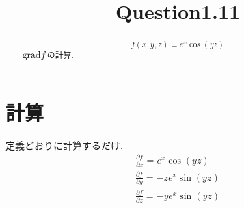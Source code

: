 \documentclass{jsarticle}
\title{Question1.11}
\newcommand*{\grad}{{\rm grad}}
\begin{document}
\maketitle

\begin{abstract}
  \[
    f(x, y, z) = e^x \cos(yz)
  \]
  $\grad f$の計算. 
\end{abstract}

\section*{計算}
定義どおりに計算するだけ. 
\begin{eqnarray*}
  \frac{\partial f}{\partial x} = e^x \cos(yz) \\
  \frac{\partial f}{\partial y} = -z e^x \sin(yz) \\
  \frac{\partial f}{\partial z} = -y e^x \sin(yz)
\end{eqnarray*}
\end{document}

